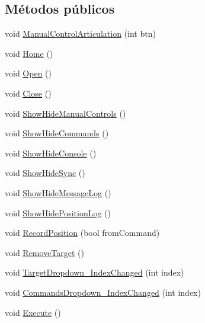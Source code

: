 \subsection*{Métodos públicos}
\begin{DoxyCompactItemize}
\item 
void \mbox{\hyperlink{class_game_controller_af2f693d76f1b9bf4ff0403802ad44cae}{Manual\+Control\+Articulation}} (int btn)
\item 
void \mbox{\hyperlink{class_game_controller_a92a798e28f38aa15306e58dbdef1099a}{Home}} ()
\item 
void \mbox{\hyperlink{class_game_controller_ab69f0ec04df1e4d52b182d1dddd0606c}{Open}} ()
\item 
void \mbox{\hyperlink{class_game_controller_a232d433ba9f07944bcc274841bf8cc7c}{Close}} ()
\item 
void \mbox{\hyperlink{class_game_controller_ab55a4d6d21f7e08aac2e27ad92033d56}{Show\+Hide\+Manual\+Controls}} ()
\item 
void \mbox{\hyperlink{class_game_controller_a473137527a8eb571f745ba44752e0a79}{Show\+Hide\+Commands}} ()
\item 
void \mbox{\hyperlink{class_game_controller_ad037a03af50093f97a244acb6ee7cfb5}{Show\+Hide\+Console}} ()
\item 
void \mbox{\hyperlink{class_game_controller_a0c878163f61d0c5f249f06076eb4414b}{Show\+Hide\+Sync}} ()
\item 
void \mbox{\hyperlink{class_game_controller_a3424f128577eb9fca02bc4eeb5c00f52}{Show\+Hide\+Message\+Log}} ()
\item 
void \mbox{\hyperlink{class_game_controller_a4115faf1339706f462166c1f82d9ec8c}{Show\+Hide\+Position\+Log}} ()
\item 
void \mbox{\hyperlink{class_game_controller_aad5d8a92a01bb1b946890c227e36ba41}{Record\+Position}} (bool from\+Command)
\item 
void \mbox{\hyperlink{class_game_controller_ad8f76a41d0163fd06971dffce1d61c97}{Remove\+Target}} ()
\item 
void \mbox{\hyperlink{class_game_controller_a6de8761e6cd2b07a857ea3ec0544fa40}{Target\+Dropdown\+\_\+\+Index\+Changed}} (int index)
\item 
void \mbox{\hyperlink{class_game_controller_a2ea8f0a42452c5dd938feed2713f87c7}{Commands\+Dropdown\+\_\+\+Index\+Changed}} (int index)
\item 
void \mbox{\hyperlink{class_game_controller_ac1dcb5c2f0422f5568ca776dd5cd7b7c}{Execute}} ()
\item 

\end{DoxyCompactItemize}
